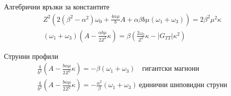 \documentclass[bulg]{beamer}
\begin{document}
\begin{frame}
   \centering
    \begin{alertblock}{Алгебрични връзки за константите}
    \begin{align*}
        &Z^{2}\left(2\left(\beta^{2}-\alpha^{2}\right) \omega_{0}+\frac{4 \alpha \mu}{b}
           A+\alpha \beta b \mu\left(\omega_{1}+\omega_{3}\right)\right)=2 \beta^{2}
           \mu^{2} \kappa\\
        &\left(\omega_{1}+\omega_{3}\right)\left(A-\frac{\alpha b \mu}{2 Z^{2}}
          \kappa\right)=\beta\left(\frac{2 \omega_{0}}{Z^{2}} \kappa-\left|G_{T T}\right|
          \kappa^{2}\right)
      \end{align*}
    \end{alertblock}
    \vspace{-0.2cm}
\begin{exampleblock}{Струнни профили}
\begin{equation*}
\begin{aligned}
&\frac{4}{b^{2}}\left(A-\frac{b \alpha \mu}{2 Z^{2}}
  \kappa\right)=-\beta\left(\omega_{1}+\omega_{3}\right) \quad \text
  {гигантски магнони}\\
&\frac{4}{b^{2}}\left(A-\frac{b \alpha \mu}{2 Z^{2}}
\kappa\right)=-\frac{\alpha^{2}}{\beta}\left(\omega_{1}+\omega_{3}\right) \ 
\text{единични шиповидни струни}
\end{aligned}
\end{equation*}
\end{exampleblock}
\end{frame}
\end{document}
